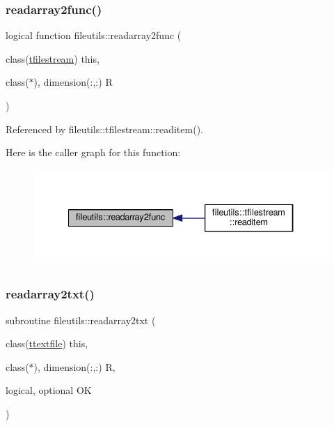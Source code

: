 \subsubsection{\texorpdfstring{readarray2func()}{readarray2func()}}
{\footnotesize\ttfamily logical function fileutils\+::readarray2func (\begin{DoxyParamCaption}\item[{class(\mbox{\hyperlink{structfileutils_1_1tfilestream}{tfilestream}})}]{this,  }\item[{class($\ast$), dimension(\+:,\+:)}]{R }\end{DoxyParamCaption})\hspace{0.3cm}{\ttfamily [private]}}



Referenced by fileutils\+::tfilestream\+::readitem().

Here is the caller graph for this function\+:
\nopagebreak
\begin{figure}[H]
\begin{center}
\leavevmode
\includegraphics[width=334pt]{namespacefileutils_abe905cf8167e2a6f36f2ddfcec24b6ad_icgraph}
\end{center}
\end{figure}
\mbox{\label{namespacefileutils_a1917cefee39a500fd5987b5165c97d8a}} 
\subsubsection{\texorpdfstring{readarray2txt()}{readarray2txt()}}
{\footnotesize\ttfamily subroutine fileutils\+::readarray2txt (\begin{DoxyParamCaption}\item[{class(\mbox{\hyperlink{structfileutils_1_1ttextfile}{ttextfile}})}]{this,  }\item[{class($\ast$), dimension(\+:,\+:)}]{R,  }\item[{logical, optional}]{OK }\end{DoxyParamCaption})\hspace{0.3cm}{\ttfamily [private]}}

